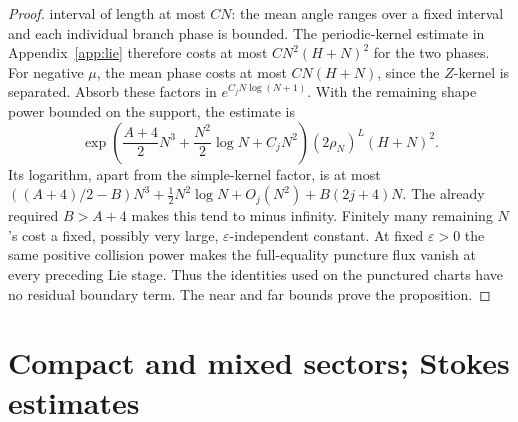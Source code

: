 \documentclass[11pt]{article}
\numberwithin{equation}{section}
\theoremstyle{definition}
\newcommand{\eps}{\varepsilon}
\begin{document}
\begin{proof}
interval of length at most \(CN\): the mean angle ranges over a
fixed interval and each individual branch phase is bounded.
The periodic-kernel estimate in Appendix~\ref{app:lie} therefore
costs at most \(CN^2(H+N)^2\) for the two phases. For negative \(\mu\),
the mean phase costs at most \(CN(H+N)\), since the \(Z\)-kernel is
separated. Absorb these factors in \(e^{C_jN\log(N+1)}\). With the
remaining shape power bounded on the support, the estimate is
\[
 \exp\left(\frac{A+4}{2}N^3+\frac{N^2}{2}\log N+C_jN^2\right)
 (2\rho_N)^L(H+N)^2.
\]
Its logarithm, apart from the simple-kernel factor, is at most
\(((A+4)/2-B)N^3+\tfrac12N^2\log N+O_j(N^2)+B(2j+4)N\).
The already required \(B>A+4\) makes this tend to minus infinity.
Finitely many remaining \(N\)'s cost a fixed, possibly very large,
\(\eps\)-independent constant.
At fixed \(\eps>0\) the same positive collision power makes the
full-equality puncture flux vanish at every preceding Lie stage.
Thus the identities used on the punctured charts have no residual
boundary term. The near and far bounds prove the proposition.
\end{proof}



\section{Compact and mixed sectors; Stokes estimates}
\label{sec:sectors}
\end{document}
